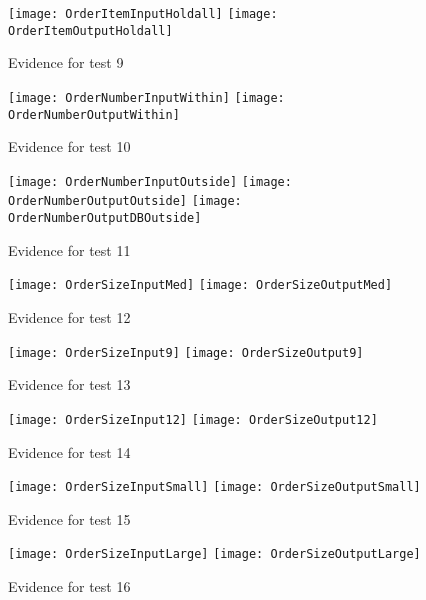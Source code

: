 \documentclass[
11pt, %
a4paper, %
oneside, %
headinclude,footinclude, %
BCOR5mm, %
]{scrartcl}
\begin{document}
\begin{appendices}
{{{{{{{{{{{{{{\begin{figure}[H]
	\label{orddettes8}
\end{figure}
\begin{figure}[H]
	\centering
	\texttt{[image: OrderItemInputHoldall]}
	\texttt{[image: OrderItemOutputHoldall]}
	\caption[Evidence C.1.2 Test 9]{Evidence for test 9}
	\label{orddettes9}
\end{figure}
\begin{figure}[H]
	\centering
	\texttt{[image: OrderNumberInputWithin]}
	\texttt{[image: OrderNumberOutputWithin]}
	\caption[Evidence C.1.2 Test 10]{Evidence for test 10}
	\label{orddettes10}	
\end{figure}
\begin{figure}[H]
	\centering
	\texttt{[image: OrderNumberInputOutside]}
	\texttt{[image: OrderNumberOutputOutside]}
	\texttt{[image: OrderNumberOutputDBOutside]}
	\caption[Evidence C.1.2 Test 11]{Evidence for test 11}
	\label{orddettes11}
\end{figure}
\begin{figure}[H]
	\centering
	\texttt{[image: OrderSizeInputMed]}
	\texttt{[image: OrderSizeOutputMed]}
	\caption[Evidence C.1.2 Test 12]{Evidence for test 12}
	\label{orddettes12}	
\end{figure}
\begin{figure}[H]
	\centering
	\texttt{[image: OrderSizeInput9]}
	\texttt{[image: OrderSizeOutput9]}
	\caption[Evidence C.1.2 Test 13]{Evidence for test 13}
	\label{orddettes13}	
\end{figure}
\begin{figure}[H]
	\centering
	\texttt{[image: OrderSizeInput12]}
	\texttt{[image: OrderSizeOutput12]}
	\caption[Evidence C.1.2 Test 14]{Evidence for test 14}
	\label{orddettes14}	
\end{figure}
\begin{figure}[H]
	\centering
	\texttt{[image: OrderSizeInputSmall]}
	\texttt{[image: OrderSizeOutputSmall]}
	\caption[Evidence C.1.2 Test 15]{Evidence for test 15}
	\label{orddettes15}	
\end{figure}
\begin{figure}[H]
	\centering
	\texttt{[image: OrderSizeInputLarge]}
	\texttt{[image: OrderSizeOutputLarge]}
	\caption[Evidence C.1.2 Test 16]{Evidence for test 16}
	\label{orddettes16}	

\end{figure}}}}}}}}}}}}}}}
\end{appendices}
\end{document}
